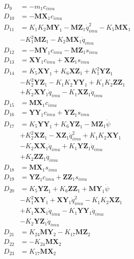 \begin{multicols}{2}
\begin{align}
D_{9} &= -m_1c_{imu} \nonumber \\
D_{10} &= -\mathbf{MX}_1c_{imu} \nonumber \\
D_{11} &= K_{1}K_{2}\mathbf{MY}_1 - \mathbf{MZ}_1\dot{q}_{imu}^2 - K_{5}\mathbf{MX}_1  \nonumber \\
&- K_{1}^2\mathbf{MZ}_1 - K_{2}\mathbf{MX}_1\dot{q}_{imu} \nonumber \\
D_{12} &= - \mathbf{MY}_1c_{imu} - \mathbf{MZ}_1s_{imu} \nonumber \\
D_{13} &= \mathbf{XY}_1c_{imu} + \mathbf{XZ}_1s_{imu} \nonumber \\
D_{14} &= K_{5}\mathbf{XY}_1 + K_{6}\mathbf{XZ}_1 + K_{1}^2\mathbf{YZ}_1  \nonumber \\
&- K_{2}^2\mathbf{YZ}_1 - K_{1}K_{2}\mathbf{YY}_1 + K_{1}K_{2}\mathbf{ZZ}_1  \nonumber \\
&+ K_{2}\mathbf{XY}_1\dot{q}_{imu} - K_{1}\mathbf{XZ}_1\dot{q}_{imu} \nonumber \\
D_{15} &= \mathbf{MX}_1c_{imu} \nonumber \\
D_{16} &= \mathbf{YY}_1c_{imu} + \mathbf{YZ}_1s_{imu} \nonumber \\
D_{17} &= K_{5}\mathbf{YY}_1 + K_{6}\mathbf{YZ}_1 - \mathbf{MZ}_1\dot{\psi}  \nonumber \\
&+ K_{2}^2\mathbf{XZ}_1 - \mathbf{XZ}_1\dot{q}_{imu}^2 + K_{1}K_{2}\mathbf{XY}_1  \nonumber \\
&- K_{2}\mathbf{XX}_1\dot{q}_{imu} + K_{1}\mathbf{YZ}_1\dot{q}_{imu}  \nonumber \\
&+ K_{2}\mathbf{ZZ}_1\dot{q}_{imu} \nonumber \\
D_{18} &= \mathbf{MX}_1s_{imu} \nonumber \\
D_{19} &= \mathbf{YZ}_1c_{imu} + \mathbf{ZZ}_1s_{imu} \nonumber \\
D_{20} &= K_{5}\mathbf{YZ}_1 + K_{6}\mathbf{ZZ}_1 + \mathbf{MY}_1\dot{\psi}  \nonumber \\
&- K_{1}^2\mathbf{XY}_1 + \mathbf{XY}_1\dot{q}_{imu}^2 - K_{1}K_{2}\mathbf{XZ}_1  \nonumber \\
&+ K_{1}\mathbf{XX}_1\dot{q}_{imu} - K_{1}\mathbf{YY}_1\dot{q}_{imu}  \nonumber \\
&- K_{2}\mathbf{YZ}_1\dot{q}_{imu} \nonumber \\
D_{21} &= K_{24}\mathbf{MY}_2 - K_{17}\mathbf{MZ}_2 \nonumber \\
D_{22} &= -K_{24}\mathbf{MX}_2 \nonumber \\
D_{23} &= K_{17}\mathbf{MX}_2 \nonumber \\

\end{align}
\end{multicols}
